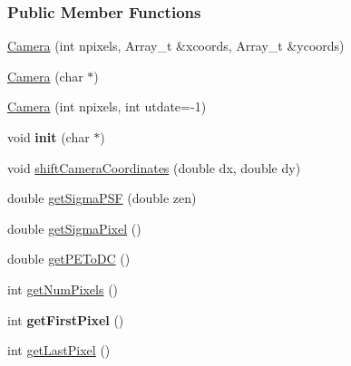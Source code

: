 \subsubsection*{Public Member Functions}
\begin{DoxyCompactItemize}
\item 
\hypertarget{classCamera_a797472a16ac17eeb0744ef09e56ba562}{
\hyperlink{classCamera_a797472a16ac17eeb0744ef09e56ba562}{Camera} (int npixels, Array\_\-t \&xcoords, Array\_\-t \&ycoords)}
\label{classCamera_a797472a16ac17eeb0744ef09e56ba562}

\item 
\hyperlink{classCamera_a0d7c5790cf94ea5e3ff670e39e037679}{Camera} (char $\ast$)
\item 
\hyperlink{classCamera_a2001776bff6855a02cddeed4706c004c}{Camera} (int npixels, int utdate=-\/1)
\item 
\hypertarget{classCamera_a0f575b530adf2e1d5e6c0ea51a22e219}{
void {\bfseries init} (char $\ast$)}
\label{classCamera_a0f575b530adf2e1d5e6c0ea51a22e219}

\item 
void \hyperlink{classCamera_a9b60c76986e0da3dd1a5f5764d718faa}{shiftCameraCoordinates} (double dx, double dy)
\item 
double \hyperlink{classCamera_a6e84df5ac1edf5b6bcfd44ddea17ee36}{getSigmaPSF} (double zen)
\item 
\hypertarget{classCamera_aa01bd8754f3f024237a094911c847798}{
double \hyperlink{classCamera_aa01bd8754f3f024237a094911c847798}{getSigmaPixel} ()}
\label{classCamera_aa01bd8754f3f024237a094911c847798}

\item 
\hypertarget{classCamera_a80e6c96d875b9d8145b87378beb41b9d}{
double \hyperlink{classCamera_a80e6c96d875b9d8145b87378beb41b9d}{getPEToDC} ()}
\label{classCamera_a80e6c96d875b9d8145b87378beb41b9d}

\item 
\hypertarget{classCamera_a4f2750f42d18cc49f5aa703466a64268}{
int \hyperlink{classCamera_a4f2750f42d18cc49f5aa703466a64268}{getNumPixels} ()}
\label{classCamera_a4f2750f42d18cc49f5aa703466a64268}

\item 
\hypertarget{classCamera_acd071e942d1e5403f7f8220f8c63edc4}{
int {\bfseries getFirstPixel} ()}
\label{classCamera_acd071e942d1e5403f7f8220f8c63edc4}

\item 
\hypertarget{classCamera_a233576d02d136e96d8886627c2512afc}{
int \hyperlink{classCamera_a233576d02d136e96d8886627c2512afc}{getLastPixel} ()}
\label{classCamera_a233576d02d136e96d8886627c2512afc}


\end{DoxyCompactItemize}
